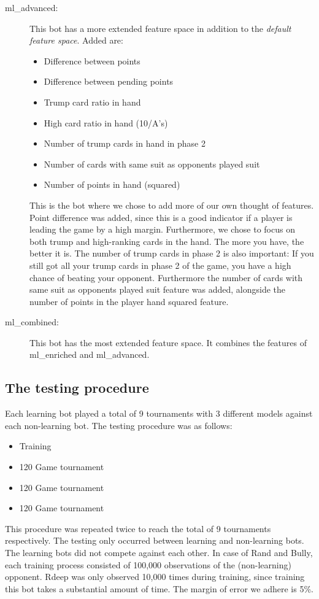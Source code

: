 \documentclass[a4paper,11pt]{article}
\begin{document}
\begin{description}
\item [ml\_advanced:] 
This bot has a more extended feature space in addition to the \textit{default feature space}. Added are: 
\begin{itemize}
\item Difference between points
\item Difference between pending points
\item Trump card ratio in hand
\item High card ratio in hand (10/A's)
\item Number of trump cards in hand in phase 2
\item Number of cards with same suit as opponents played suit
\item Number of points in hand (squared)
\end{itemize}
This is the bot where we chose to add more of our own thought of features. Point difference was added, since this is a good indicator if a player is leading the game by a high margin. Furthermore, we chose to focus on both trump and high-ranking cards in the hand. The more you have, the better it is. The number of trump cards in phase 2 is also important: If you still got all your trump cards in phase 2 of the game, you have a high chance of beating your opponent. Furthermore the number of cards with same suit as opponents played suit feature was added, alongside the number of points in the player hand squared feature.

\item[ml\_combined:] This bot has the most extended feature space. It combines the features of ml\_enriched and ml\_advanced.
\end{description}
\subsection{The testing procedure}

Each learning bot played a total of 9 tournaments with 3 different models against each non-learning bot.
The testing procedure was as follows:
\begin{itemize}
\item Training
\item 120 Game tournament
\item 120 Game tournament
\item 120 Game tournament
\end{itemize}

This procedure was repeated twice to reach the total of 9 tournaments respectively. The testing only occurred between learning and non-learning bots.  The learning bots did not compete against each other.  In case of Rand and Bully, each training process consisted of 100,000 observations of the (non-learning) opponent. Rdeep was only observed 10,000 times during training, since training this bot takes a substantial amount of time. The margin of error we adhere is 5\%.
\clearpage
\end{document}
